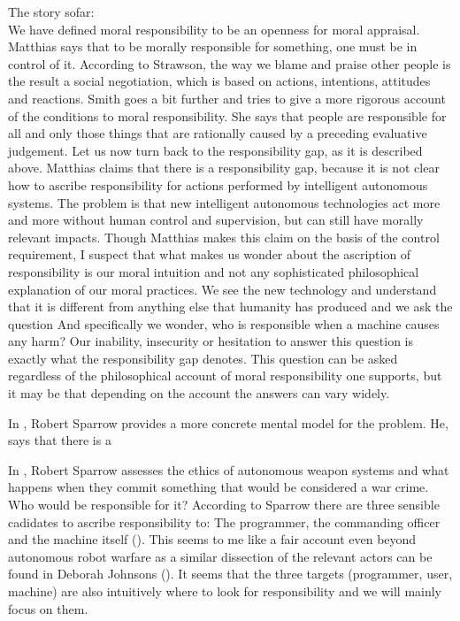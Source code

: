 \documentclass{article}
\begin{document}
The story sofar:\\
We have defined moral responsibility to be an openness for moral appraisal.
Matthias says that to be morally responsible for something, one must be in
control of it. According to Strawson, the way we blame and praise other people
is the result a social negotiation, which is based on actions, intentions, attitudes and
reactions. Smith goes a bit further and tries to give a more rigorous account of
the conditions to moral responsibility. She says that people are responsible for
all and only those things that are rationally caused by a preceding evaluative
judgement. Let us now turn back to the responsibility gap, as it is described
above. Matthias claims that there is a responsibility gap, because it is not
clear how to ascribe responsibility for actions performed by intelligent
autonomous systems. The problem is that new intelligent autonomous technologies
act more and more without human control and supervision, but can still have
morally relevant impacts. Though Matthias makes this claim on the basis of the
control requirement, I suspect that what makes us wonder about the
ascription of responsibility is our moral intuition and not any sophisticated
philosophical explanation of our moral practices. We see the new technology and
understand that it is different from anything else that humanity has produced
and we ask the question  And specifically we
wonder, who is responsible when a machine causes any harm?
Our inability, insecurity or hesitation to answer this question is exactly what
the responsibility gap denotes.
This question can be asked regardless of the philosophical account of moral
responsibility one supports, but it may be that depending on the account the
answers can vary widely.

In , Robert Sparrow provides a more concrete mental model for
the problem. He, says that there is a 



In , Robert Sparrow assesses the ethics of
autonomous weapon systems and what happens when they commit something that would
be considered a war crime. Who would be responsible for it? According to Sparrow
there are three sensible cadidates to ascribe responsibility to: The programmer,
the commanding officer and the machine itself (\cite[p.
69-71]{sparrow2007killer}). This seems to me like a fair account even beyond
autonomous robot warfare as a similar dissection of the relevant actors can be
found in Deborah Johnsons  (\cite[p.
202]{johnson2006computer}). It seems that the three targets (programmer, user,
machine) are also intuitively where to look for responsibility and we will mainly
focus on them.\\
\end{document}
